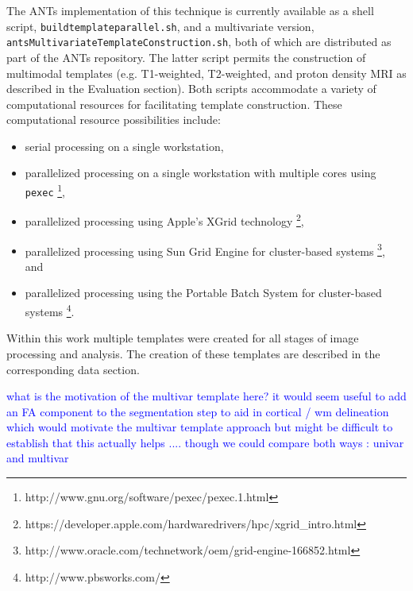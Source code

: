 The ANTs implementation of this technique is currently available as a shell script, 
\verb#buildtemplateparallel.sh#, and a multivariate version,
\verb#antsMultivariateTemplateConstruction.sh#, both of which are distributed as part of
 the ANTs repository.
The latter script permits the construction of multimodal templates (e.g. 
T1-weighted, T2-weighted, and proton density MRI as described in the 
Evaluation section).  Both scripts accommodate a variety of computational resources
for facilitating template construction.  These computational resource possibilities include:
\begin{itemize}
  \item serial processing on a single workstation, 
  \item parallelized processing on a single workstation with multiple cores using \verb#pexec#%
  \footnote{http://www.gnu.org/software/pexec/pexec.1.html},
  \item parallelized processing using Apple's XGrid technology%
  \footnote{https://developer.apple.com/hardwaredrivers/hpc/xgrid\_intro.html}, 
  \item parallelized processing using Sun Grid Engine for cluster-based systems%
  \footnote{http://www.oracle.com/technetwork/oem/grid-engine-166852.html}, and 
  \item parallelized processing using the Portable Batch System for cluster-based systems%
  \footnote{http://www.pbsworks.com/}.
\end{itemize}
Within this work multiple templates were created for all stages of 
image processing and analysis.  The creation of these templates are described
in the corresponding data section.

\textcolor{blue}{what is the motivation of the multivar template here?
  it would seem useful to add an FA component to the segmentation step
  to aid in cortical / wm delineation which would motivate the
  multivar template approach but might be difficult to establish that
  this actually helps .... though we could compare both ways : univar
  and multivar }

